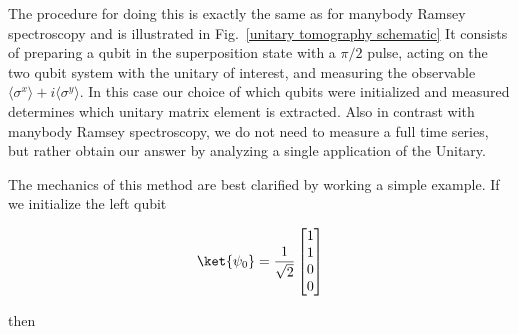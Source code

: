 The procedure for doing this is exactly the same as for manybody Ramsey spectroscopy and is illustrated in Fig.~\ref{unitary tomography schematic}
It consists of preparing a qubit in the superposition state with a $\pi / 2$ pulse,
acting on the two qubit system with the unitary of interest,
and measuring the observable $\langle \sigma^x \rangle + i \langle \sigma^y \rangle$.
In this case our choice of which qubits were initialized and measured determines which unitary matrix element is extracted.
Also in contrast with manybody Ramsey spectroscopy, we do not need to measure a full time series, but rather obtain our answer by analyzing a single application of the Unitary.



The mechanics of this method are best clarified by working a simple example.
If we initialize the left qubit

\begin{equation}
    \ket{\psi_0}=\frac{1}{\sqrt{2}}
    \begin{bmatrix}
        1 \\
        1 \\
        0 \\
        0 \\
    \end{bmatrix}
\end{equation}

then

